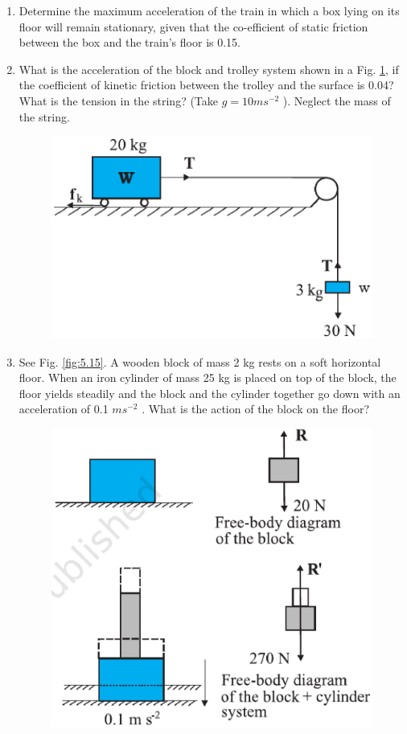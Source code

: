 \begin{enumerate}[label=\arabic*.,ref=\thesection.\theenumi]
\item Determine the maximum acceleration of the train in which a box lying on its floor will remain stationary, given that the co-efficient of static friction between the box and the train’s floor is 0.15.
\item What is the acceleration of the block and trolley system shown in a Fig. \ref{fig:5.12}, if the coefficient of kinetic friction between the trolley and the surface is 0.04? What is the tension in the string? (Take $g = 10 m s^{-2}$
). Neglect the mass of the string.
\begin{figure}[!ht]
\centering
\includegraphics[width=\columnwidth]{./figs/11-1/5/5.12.eps}
\caption{}
\label{fig:5.12}
\end{figure} 
\item See Fig. \ref{fig:5.15}. A wooden block of mass 2 kg rests on a soft horizontal floor. When an iron cylinder of mass 25 kg is placed on top of the block, the floor yields steadily and the block and the cylinder together go down with an acceleration of 0.1 $m s^{-2}$
. What is the action of the block
on the floor?
\begin{figure}[!ht]
\centering
\includegraphics[width=\columnwidth]{./figs/11-1/5/5.15.eps}

\end{figure}
\end{enumerate}
